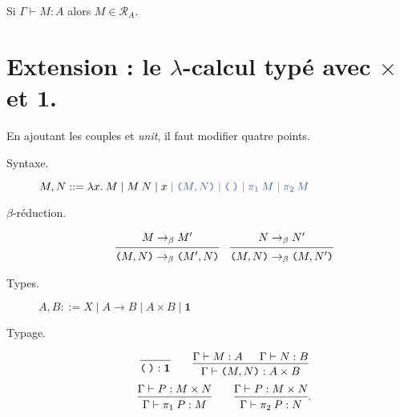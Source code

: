 \documentclass[./main]{subfiles}
\begin{document}
  \begin{crlr}
    Si $\Gamma \vdash M : A$ alors $M \in \mathcal{R}_A$.
  \end{crlr}

  \section{Extension : le $\lambda$-calcul typé avec $\times$ et $\mathbf{1}$.}
  En ajoutant les couples et \textit{unit}, il faut modifier quatre points.
  \begin{description}
    \item[Syntaxe.] $M, N ::= \lambda x.\: M  \mid M \: N  \mid x {\color{deepblue} {}\mid \mathtt{(} M, N \mathtt{)}  \mid \mathtt{(\:)}  \mid \pi_1 \: M  \mid \pi_2 \: M}$
    \item[$\beta$-réduction.]
      \[
      \begin{prooftree} \hypo{M \to_\beta M'} \infer 1{\mathtt{(} M, N \mathtt{)} \to_\beta \mathtt{(} M', N \mathtt{)}} \end{prooftree} \quad
      \begin{prooftree} \hypo{N \to_\beta N'} \infer 1{\mathtt{(} M, N \mathtt{)} \to_\beta \mathtt{(} M, N' \mathtt{)}} \end{prooftree}\]
    \item[Types.] $A, B ::= X  \mid A \to B  \mid A \times B  \mid \mathbf{1}$
    \item[Typage.]
      \[
      \begin{prooftree}
        \infer 0{\mathtt{(\:)} : \mathbf{1}}
      \end{prooftree}
      \quad\quad
      \begin{prooftree}
        \hypo{\Gamma \vdash M : A}
        \hypo{\Gamma \vdash N : B}
        \infer 2{\Gamma \vdash \mathtt{(} M, N \mathtt{)} : A \times B}
      \end{prooftree}
      \] 
      \[
      \begin{prooftree}
        \hypo{\Gamma \vdash P : M \times N}
        \infer 1{\Gamma \vdash \pi_1 \: P : M}
      \end{prooftree}
      \quad\quad
      \begin{prooftree}
        \hypo{\Gamma \vdash P : M \times N}
        \infer 1{\Gamma \vdash \pi_2 \: P : N}
      \end{prooftree}
      .\]
  \end{description}
\end{document}
